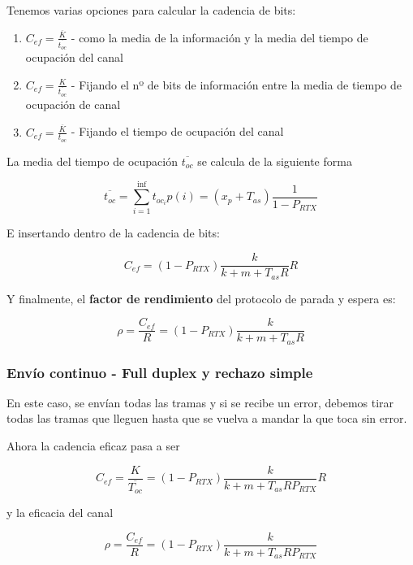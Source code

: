 \documentclass{article}
\begin{document}
Tenemos varias opciones para calcular la cadencia de bits:

\begin{enumerate}
    \item $C_{ef} = \frac{\overline{K}}{\overline{t_{oc}}}$ - como la media de la información y la media del tiempo de ocupación del canal
    \item $C_{ef} = \frac{K}{\overline{t_{oc}}}$ - Fijando el nº de bits de información entre la media de tiempo de ocupación de canal
    \item $C_{ef} = \frac{\overline{K}}{t_{oc}}$ - Fijando el tiempo de ocupación del canal 
\end{enumerate}

La media del tiempo de ocupación $\overline{t_{oc}}$ se calcula de la siguiente forma

\begin{equation}
    \overline{t_{oc}} =
    \sum_{i=1}^{\inf} t_{oc_i}p(i) =
    (x_p+T_{as})\frac{1}{1-P_{RTX}}
\end{equation}

E insertando dentro de la cadencia de bits:

\begin{equation}
    C_{ef} = (1-P_{RTX})\frac{k}{k+m+T_{as}R}R
\end{equation}

Y finalmente, el \textbf{factor de rendimiento} del protocolo de parada y espera es:

\begin{equation}
    \rho = \frac{C_{ef}}{R} = (1-P_{RTX})\frac{k}{k+m+T_{as}R}
\end{equation}

\subsubsection{Envío continuo - Full duplex y rechazo simple}

En este caso, se envían todas las tramas y si se recibe un error, debemos tirar todas las tramas que lleguen hasta que se vuelva a mandar la que toca sin error.

Ahora la cadencia eficaz pasa a ser

\begin{equation}
    C_{ef} = \frac{K}{\overline{T_{oc}}} = (1-P_{RTX})\frac{k}{k+m+T_{as}RP_{RTX}}R
\end{equation}

y la eficacia del canal

\begin{equation}
   \rho = \frac{C_{ef}}{R} = (1-P_{RTX})\frac{k}{k+m+T_{as}RP_{RTX}}
\end{equation}
\end{document}
